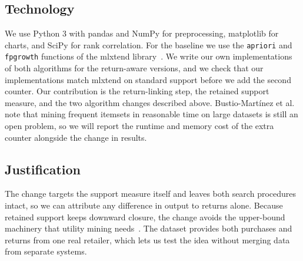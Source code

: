 \documentclass[11pt,a4paper]{article}
\begin{document}
\subsection*{Technology}

We use Python 3 with pandas and NumPy for preprocessing, matplotlib for charts, and SciPy for rank correlation. For the baseline we use the \texttt{apriori} and \texttt{fpgrowth} functions of the mlxtend library~\cite{raschka2018}. We write our own implementations of both algorithms for the return-aware versions, and we check that our implementations match mlxtend on standard support before we add the second counter. Our contribution is the return-linking step, the retained support measure, and the two algorithm changes described above. Bustio-Mart{\'i}nez et al.~\cite{bustio2022} note that mining frequent itemsets in reasonable time on large datasets is still an open problem, so we will report the runtime and memory cost of the extra counter alongside the change in results.

\subsection*{Justification}

The change targets the support measure itself and leaves both search procedures intact, so we can attribute any difference in output to returns alone. Because retained support keeps downward closure, the change avoids the upper-bound machinery that utility mining needs~\cite{gan2021}. The dataset provides both purchases and returns from one real retailer, which lets us test the idea without merging data from separate systems.
\end{document}
